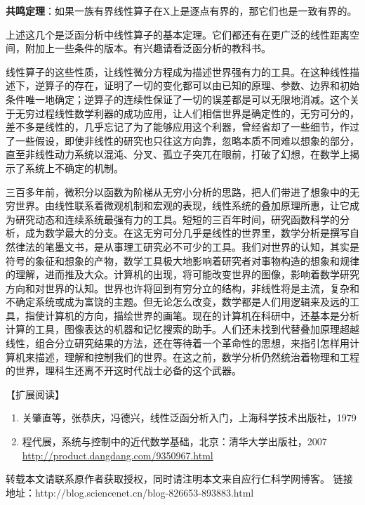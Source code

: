 \textbf{共鸣定理}：如果一族有界线性算子在X上是逐点有界的，那它们也是一致有界的。

上述这几个是泛函分析中线性算子的基本定理。它们都还有在更广泛的线性距离空间，附加上一些条件的版本。有兴趣请看泛函分析的教科书。

线性算子的这些性质，让线性微分方程成为描述世界强有力的工具。在这种线性描述下，逆算子的存在，证明了一切的变化都可以由已知的原理、参数、边界和初始条件唯一地确定；逆算子的连续性保证了一切的误差都是可以无限地消减。这个关于无穷过程线性数学利器的成功应用，让人们相信世界是确定性的，无穷可分的，差不多是线性的，几乎忘记了为了能够应用这个利器，曾经省却了一些细节，作过了一些假设，即使非线性的研究也只往这方向靠，忽略本质不同难以想象的部分，直至非线性动力系统以混沌、分叉、孤立子突兀在眼前，打破了幻想，在数学上揭示了系统上不确定的机制。

三百多年前，微积分以函数为阶梯从无穷小分析的思路，把人们带进了想象中的无穷世界。由线性联系着微观机制和宏观的表现，线性系统的叠加原理所惠，让它成为研究动态和连续系统最强有力的工具。短短的三百年时间，研究函数科学的分析，成为数学最大的分支。在这无穷可分几乎是线性的世界里，数学分析是撰写自然律法的笔墨文书，是从事理工研究必不可少的工具。我们对世界的认知，其实是符号的象征和想象的产物，数学工具极大地影响着研究者对事物构造的想象和规律的理解，进而推及大众。计算机的出现，将可能改变世界的图像，影响着数学研究方向和对世界的认知。世界也许将回到有穷分立的结构，非线性将是主流，复杂和不确定系统或成为富饶的主题。但无论怎么改变，数学都是人们用逻辑来及远的工具，指使计算机的方向，描绘世界的画笔。现在的计算机在科研中，还基本是分析计算的工具，图像表达的机器和记忆搜索的助手。人们还未找到代替叠加原理超越线性，组合分立研究结果的方法，还在等待着一个革命性的思想，来指引怎样用计算机来描述，理解和控制我们的世界。在这之前，数学分析仍然统治着物理和工程的世界，理科生还离不开这时代战士必备的这个武器。



【扩展阅读】

\begin{enumerate}
	\item 关肇直等，张恭庆，冯德兴，线性泛函分析入门，上海科学技术出版社，1979

	\item 程代展，系统与控制中的近代数学基础，北京：清华大学出版社，2007 
	\url{http://product.dangdang.com/9350967.html}


\end{enumerate}

转载本文请联系原作者获取授权，同时请注明本文来自应行仁科学网博客。
链接地址：http://blog.sciencenet.cn/blog-826653-893883.html 